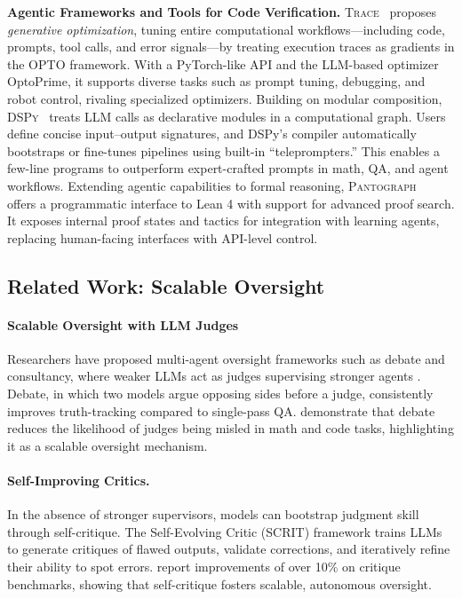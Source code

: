\documentclass{article}
\begin{document}
\textbf{Agentic Frameworks and Tools for Code Verification.}
\textsc{Trace}~\citep{cheng2024trace} proposes \emph{generative optimization}, tuning entire computational workflows—including code, prompts, tool calls, and error signals—by treating execution traces as gradients in the OPTO framework. With a PyTorch-like API and the LLM-based optimizer OptoPrime, it supports diverse tasks such as prompt tuning, debugging, and robot control, rivaling specialized optimizers.
Building on modular composition, \textsc{DSPy}~\citep{khattab2024dspy} treats LLM calls as declarative modules in a computational graph. Users define concise input–output signatures, and DSPy’s compiler automatically bootstraps or fine-tunes pipelines using built-in “teleprompters.” This enables a few-line programs to outperform expert-crafted prompts in math, QA, and agent workflows.
Extending agentic capabilities to formal reasoning, \textsc{Pantograph}~\citep{aniva2025pantograph} offers a programmatic interface to Lean 4 with support for advanced proof search. It exposes internal proof states and tactics for integration with learning agents, replacing human-facing interfaces with API-level control.

\subsection{Related Work: Scalable Oversight}

\paragraph{Scalable Oversight with LLM Judges}
Researchers have proposed multi-agent oversight frameworks such as debate and consultancy, where weaker LLMs act as judges supervising stronger agents \citep{kenton2024oversight,Chan2024ChatEval}.
Debate, in which two models argue opposing sides before a judge, consistently improves truth-tracking compared to single-pass QA. \citet{kenton2024oversight} demonstrate that debate reduces the likelihood of judges being misled in math and code tasks, highlighting it as a scalable oversight mechanism.

\paragraph{Self-Improving Critics.}
In the absence of stronger supervisors, models can bootstrap judgment skill through self-critique.
The Self-Evolving Critic (SCRIT) framework trains LLMs to generate critiques of flawed outputs, validate corrections, and iteratively refine their ability to spot errors. \citet{zheng2024scrit} report improvements of over 10\% on critique benchmarks, showing that self-critique fosters scalable, autonomous oversight.
\end{document}
